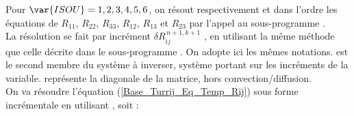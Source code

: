 Pour $\var{ISOU} = 1,2,3,4,5,6$, on r\'esout respectivement et dans
l'ordre  les
\'equations de $R_{11}$, $R_{22}$, $R_{33}$, $R_{12}$, $R_{13}$ et $R_{23}$ par
l'appel au sous-programme .\\
La r\'esolution se fait par incr\'ement $\delta {R}_{ij}^{\,n+1,k+1}$ , en utilisant la m\^eme m\'ethode que
celle d\'ecrite dans le sous-programme . On adopte ici les m\^emes notations.
 est le second membre du syst\`eme \`a inverser, syst\`eme portant sur
les incr\'ements de la variable.  repr\'esente la diagonale de la
matrice, hors convection/diffusion.\\
On va r\'esoudre l'\'equation (\ref{Base_Turrij_Eq_Temp_Rij}) sous forme incr\'ementale en
utilisant , soit :
